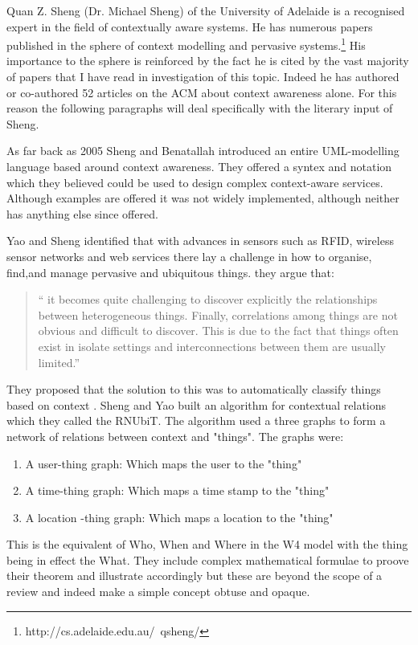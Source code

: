 \documentclass[]{report}
\begin{document}
Quan Z. Sheng (Dr. Michael Sheng) of the University of Adelaide is a recognised expert in the field of contextually aware systems. He has numerous papers published in the sphere of context modelling and pervasive systems.\footnote{http://cs.adelaide.edu.au/~qsheng/} His importance to the sphere is reinforced by the fact he is cited by the vast majority of papers that I have read in investigation of this topic. Indeed he has authored or co-authored 52 articles on the ACM about context awareness alone. For this reason the following paragraphs will deal specifically with the literary input of Sheng.\par
 As far back as 2005 Sheng and Benatallah introduced an entire UML-modelling language based around context awareness\cite{6}. They offered a syntex and notation which they believed could be used to design complex context-aware services. Although examples are offered it was not widely implemented, although neither has anything else since offered.\par
 Yao and Sheng\cite{7} identified that with advances in sensors such as RFID, wireless sensor networks and web services there lay a challenge in how to organise, find,and manage pervasive and ubiquitous things. they argue that:
 \begin{quote}
 `` it
 becomes quite challenging to discover explicitly the relationships
 between heterogeneous things. Finally, correlations among things
 are not obvious and difficult to discover. This is due to the fact that
 things often exist in isolate settings and interconnections between
 them are usually limited.''
\end{quote}
 They proposed that the solution to this was to automatically classify things based on context . Sheng and Yao built an algorithm for contextual relations which they called the RNUbiT. The algorithm used a three graphs to form a network of relations between context and "things". The graphs were:
 \begin{enumerate}
 	\item A user-thing graph: Which maps the user to the "thing"
 	\item A time-thing graph: Which maps a time stamp to the "thing"
 	\item A location -thing graph: Which maps a location to the "thing"
 \end{enumerate}
 This is the equivalent of Who, When and Where in the W4 model\cite{2} with the thing being in effect the What. They include complex mathematical formulae to proove their theorem and illustrate accordingly but these are beyond the scope of a review and indeed make a simple concept obtuse and opaque.
\end{document}
